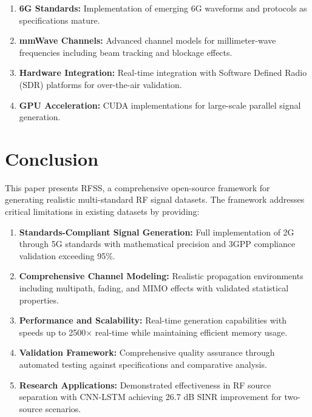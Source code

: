 \documentclass[conference]{IEEEtran}
\begin{document}
\begin{enumerate}
\item \textbf{6G Standards:} Implementation of emerging 6G waveforms and protocols as specifications mature.

\item \textbf{mmWave Channels:} Advanced channel models for millimeter-wave frequencies including beam tracking and blockage effects.

\item \textbf{Hardware Integration:} Real-time integration with Software Defined Radio (SDR) platforms for over-the-air validation.

\item \textbf{GPU Acceleration:} CUDA implementations for large-scale parallel signal generation.
\end{enumerate}

\section{Conclusion}
\label{sec:conclusion}

This paper presents RFSS, a comprehensive open-source framework for generating realistic multi-standard RF signal datasets. The framework addresses critical limitations in existing datasets by providing:

\begin{enumerate}
\item \textbf{Standards-Compliant Signal Generation:} Full implementation of 2G through 5G standards with mathematical precision and 3GPP compliance validation exceeding 95\%.

\item \textbf{Comprehensive Channel Modeling:} Realistic propagation environments including multipath, fading, and MIMO effects with validated statistical properties.

\item \textbf{Performance and Scalability:} Real-time generation capabilities with speeds up to 2500$\times$ real-time while maintaining efficient memory usage.

\item \textbf{Validation Framework:} Comprehensive quality assurance through automated testing against specifications and comparative analysis.

\item \textbf{Research Applications:} Demonstrated effectiveness in RF source separation with CNN-LSTM achieving 26.7 dB SINR improvement for two-source scenarios.
\end{enumerate}
\end{document}
